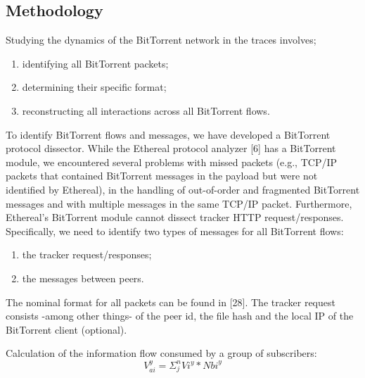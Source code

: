 \documentclass[12pt]{ilu}
\begin{document}
\subsection{Methodology}
Studying the dynamics of the BitTorrent network in the traces involves;
\begin{enumerate}
\item	identifying all BitTorrent packets;
\item	determining their specific format; 
\item	reconstructing all interactions across all BitTorrent flows.
\end{enumerate}

To identify BitTorrent flows and messages, we have developed a BitTorrent protocol dissector. While the Ethereal protocol analyzer [6] has a BitTorrent module, we encountered several problems with missed packets (e.g., TCP/IP packets that contained BitTorrent messages in the payload but were not identified by Ethereal), in the handling of out-of-order and fragmented BitTorrent messages and with multiple messages in the same TCP/IP packet. Furthermore, Ethereal’s BitTorrent module cannot dissect tracker HTTP request/responses. Specifically, we need to identify two types of messages for all BitTorrent flows: 

\begin{enumerate}
\item	the tracker request/responses; 
\item	the messages between peers.
\end{enumerate}

 The nominal format for all packets can be found in [28]. The tracker request consists -among other things- of the peer id, the file hash and the local IP of the BitTorrent client (optional).

 Calculation of the information flow consumed by a group of subscribers:
 \begin{equation}
    V_{ai}^{y}=\Sigma_{j}^{n}V{i}^{y}*N{bi}^{y}
    \label{eq1}
\end{equation}
\end{document}
